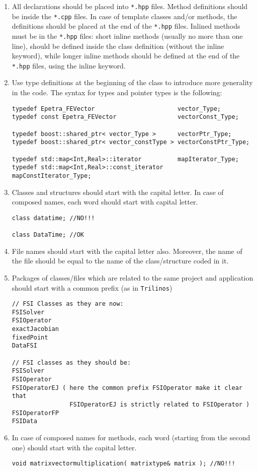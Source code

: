 \documentclass[10p]{article}
\begin{document}
\begin{enumerate}
  \item All declarations should be placed into \texttt{*.hpp} files. Method definitions should be inside the \texttt{*.cpp} files. In case of template classes and/or methods, the definitions should be placed at the end of the \texttt{*.hpp} files. Inlined methods must be in the \texttt{*.hpp} files: short inline methods (usually no more than one line), should be defined inside the class definition (without the inline keyword), while longer inline methods should be defined at the end of the \texttt{*.hpp} files, using the inline keyword. 
  \item Use type definitions at the beginning of the class to introduce more generality in the code. The syntax for types and pointer types is the following:
\begin{lstlisting}
typedef Epetra_FEVector                       vector_Type;
typedef const Epetra_FEVector                 vectorConst_Type;

typedef boost::shared_ptr< vector_Type >      vectorPtr_Type;
typedef boost::shared_ptr< vector_constType > vectorConstPtr_Type;

typedef std::map<Int,Real>::iterator          mapIterator_Type;
typedef std::map<Int,Real>::const_iterator    mapConstIterator_Type;
\end{lstlisting}
  \item Classes and structures should start with the capital letter. In case of composed names, each word should start with capital letter.
\begin{lstlisting}
class datatime; //NO!!!

class DataTime; //OK
\end{lstlisting}
  \item File names should start with the capital letter also. Moreover, the name of the file should be equal to the name of the class/structure coded in it.
  \item Packages of classes/files which are related to the same project and application should start with a common prefix
  (as in \texttt{Trilinos})
\begin{lstlisting}
// FSI Classes as they are now:
FSISolver
FSIOperator
exactJacobian
fixedPoint
DataFSI

// FSI classes as they should be:
FSISolver
FSIOperator
FSIOperatorEJ ( here the common prefix FSIOperator make it clear that
                FSIOperatorEJ is strictly related to FSIOperator )
FSIOperatorFP
FSIData
\end{lstlisting}
  \item In case of composed names for methods, each word (starting from the second one) should start with the capital letter.
\begin{lstlisting}
void matrixvectormultiplication( matrixtype& matrix ); //NO!!!


\end{lstlisting}
\end{enumerate}
\end{document}
